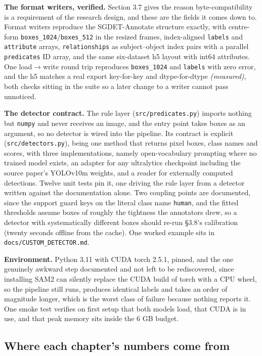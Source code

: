 \textbf{The format writers, verified.} Section 3.7 gives the reason byte-compatibility is a requirement of the research design, and these are the fields it comes down to. Format writers reproduce the SGDET-Annotate structure exactly, with centre-form \texttt{boxes\_\allowbreak{}1024}/\texttt{boxes\_\allowbreak{}512} in the resized frames, index-aligned \texttt{labels} and \texttt{attribute} arrays, \texttt{relationships} as subject--object index pairs with a parallel \texttt{predicates} ID array, and the same six-dataset h5 layout with int64 attributes. One load$\rightarrow$write round trip reproduces \texttt{boxes\_\allowbreak{}1024} and \texttt{labels} with zero error, and the h5 matches a real export key-for-key and dtype-for-dtype \textit{(measured)}, both checks sitting in the suite so a later change to a writer cannot pass unnoticed.

\textbf{The detector contract.} The rule layer (\texttt{src/predicates.py}) imports nothing but \texttt{numpy} and never receives an image, and the entry point takes boxes as an argument, so no detector is wired into the pipeline. Its contract is explicit (\texttt{src/detectors.py}), being one method that returns pixel boxes, class names and scores, with three implementations, namely open-vocabulary prompting where no trained model exists, an adapter for any ultralytics checkpoint including the source paper's YOLOv10m weights, and a reader for externally computed detections. Twelve unit tests pin it, one driving the rule layer from a detector written against the documentation alone. Two coupling points are documented, since the support guard keys on the literal class name \texttt{human}, and the fitted thresholds assume boxes of roughly the tightness the annotators drew, so a detector with systematically different boxes should re-run \S{}3.8's calibration (twenty seconds offline from the cache). One worked example sits in \texttt{docs/CUSTOM\_\allowbreak{}DETECTOR.md}.

\textbf{Environment.} Python 3.11 with CUDA torch 2.5.1, pinned, and the one genuinely awkward step documented and not left to be rediscovered, since installing SAM2 can silently replace the CUDA build of torch with a CPU wheel, so the pipeline still runs, produces identical labels and takes an order of magnitude longer, which is the worst class of failure because nothing reports it. One smoke test verifies on first setup that both models load, that CUDA is in use, and that peak memory sits inside the 6 GB budget.

\subsection{Where each chapter's numbers come from}

